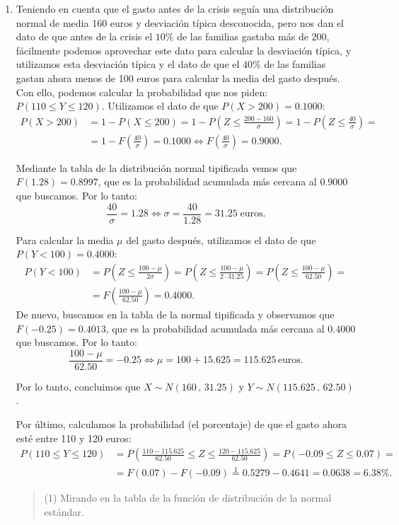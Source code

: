 {\begin{enumerate}
\item Teniendo en cuenta que el gasto antes de la crisis seguía una distribución normal de media 160 euros y desviación típica desconocida, pero nos dan el dato de que antes de la crisis el $10\%$ de las familias gastaba más de 200, fácilmente podemos aprovechar este dato para calcular la desviación típica, y utilizamos esta desviación típica y el dato de que el $40\%$ de las familias gastan ahora menos de 100 euros para calcular la media del gasto después. Con ello, podemos calcular la probabilidad que nos piden: $P(110 \leq Y \leq 120)$.
Utilizamos el dato de que $P(X>200)=0.1000$:
\begin{align*}
P(X > 200) &= 1 - P(X \le 200) = 1 - P\left( {Z \le \frac{{200 - 160}}{\sigma }} \right) = 1 - P\left( {Z \le \frac{{40}}{\sigma }} \right) =\\
&= 1 - F\left( {\frac{{40}}{\sigma }} \right)=0.1000 \Leftrightarrow F\left( {\frac{{40}}{\sigma }} \right) = 0.9000.
\end{align*}

Mediante la tabla de la distribución normal tipificada vemos que $F(1.28)=0.8997$, que es la probabilidad acumulada más cercana al $0.9000$ que buscamos. Por lo tanto:
\[
\frac{{40}}{\sigma } = 1.28 \Leftrightarrow \sigma  = \frac{{40}}{{1.28}} = 31.25\;\mbox{euros}.
\]

Para calcular la media $\mu$ del gasto después, utilizamos el dato de que $P(Y<100)=0.4000$:
\begin{align*}
P(Y < 100) &= P\left({Z \le \frac{{100 - \mu }}{{2\sigma }}} \right) = P\left( {Z \le \frac{{100 - \mu }}{{2 \cdot 31.25}}} \right) = P\left( {Z \le \frac{{100 - \mu }}{{62.50}}} \right)=\\
&=F\left( {\frac{{100 - \mu }}{{62.50}}} \right)=0.4000.
\end{align*}
De nuevo, buscamos en la tabla de la normal tipificada y observamos que $F(-0.25)=0.4013$, que es la probabilidad acumulada más cercana al $0.4000$ que buscamos. Por lo tanto:
\[
\frac{{100 - \mu }}{{62.50}} =  - 0.25 \Leftrightarrow \mu  = 100 + 15.625 = 115.625\,\mbox{euros}.
\]

Por lo tanto, concluimos que $X\sim N(160\,,\,31.25)$ y $Y\sim N(115.625\,,\,62.50)$.

Por último, calculamos la probabilidad (el porcentaje) de que el gasto ahora esté entre 110 y 120 euros:
\begin{align*}
P(110 \le Y \le 120) &= P\left( {\frac{{110 - 115.625}}{{62.50}} \le Z \le \frac{{120 - 115.625}}{{62.50}}} \right) = P\left( { - 0.09 \le Z \le 0.07} \right) =\\
&= F(0.07) - F( - 0.09) \stackrel{1}{=} 0.5279 - 0.4641 = 0.0638=6.38\%.
\end{align*}
\begin{quotation}
\footnotesize (1) Mirando en la tabla de la función de distribución de la normal estándar.
\end{quotation}


\end{enumerate}}
